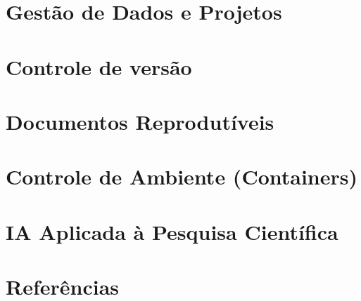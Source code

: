 \documentclass[
  a4paper,
]{article}
\begin{document}

\section{Gestão de Dados e Projetos}\label{sec-project}


\section{Controle de versão}\label{sec-git}


\section{Documentos Reprodutíveis}\label{sec-quarto}


\section{Controle de Ambiente (Containers)}\label{sec-docker}


\section{IA Aplicada à Pesquisa Científica}\label{sec-AI}


\section*{Referências}\label{referuxeancias}

\end{document}

